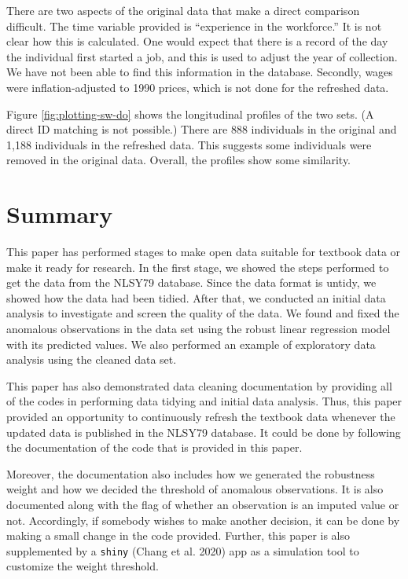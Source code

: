 \documentclass{article}
\begin{document}
There are two aspects of the original data that make a direct comparison difficult. The time variable provided is ``experience in the workforce.'' It is not clear how this is calculated. One would expect that there is a record of the day the individual first started a job, and this is used to adjust the year of collection. We have not been able to find this information in the database. Secondly, wages were inflation-adjusted to 1990 prices, which is not done for the refreshed data.

Figure \ref{fig:plotting-sw-do} shows the longitudinal profiles of the two sets. (A direct ID matching is not possible.) There are 888 individuals in the original and 1,188 individuals in the refreshed data. This suggests some individuals were removed in the original data. Overall, the profiles show some similarity.

\hypertarget{summary}{%
\section{Summary}\label{summary}}

This paper has performed stages to make open data suitable for textbook data or make it ready for research. In the first stage, we showed the steps performed to get the data from the NLSY79 database. Since the data format is untidy, we showed how the data had been tidied. After that, we conducted an initial data analysis to investigate and screen the quality of the data. We found and fixed the anomalous observations in the data set using the robust linear regression model with its predicted values. We also performed an example of exploratory data analysis using the cleaned data set.

This paper has also demonstrated data cleaning documentation by providing all of the codes in performing data tidying and initial data analysis. Thus, this paper provided an opportunity to continuously refresh the textbook data whenever the updated data is published in the NLSY79 database. It could be done by following the documentation of the code that is provided in this paper.

Moreover, the documentation also includes how we generated the robustness weight and how we decided the threshold of anomalous observations. It is also documented along with the flag of whether an observation is an imputed value or not. Accordingly, if somebody wishes to make another decision, it can be done by making a small change in the code provided. Further, this paper is also supplemented by a \texttt{shiny} (Chang et al. 2020) app as a simulation tool to customize the weight threshold.
\end{document}
